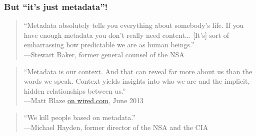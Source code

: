 \begin{frame}
  \frametitle{But ``it's just metadata''!}
  \begin{quotation}
    ``Metadata absolutely tells you everything about somebody’s life. 
    If you have enough metadata you don’t really need content$\dots$ 
    [It’s] sort of embarrassing how predictable we are as human beings.'' \\
    \hfill---Stewart Baker, former general counsel of the NSA\\[1cm]
  \end{quotation}

  {
    \begin{quotation}
      ``Metadata is our context. And that can reveal far more about us than the
      words we speak. Context yields insights into who we are and the implicit,
      hidden relationships between us.'' \\
      \hfill---Matt Blaze
      \href{http://www.wired.com/2013/06/phew-it-was-just-metadata-not-think-again/}{on
        wired.com}, June 2013
    \end{quotation}
  }

  {
    \begin{quotation}
    ``We kill people based on metadata.''\\
    \hfill---Michael Hayden, former director of the NSA and the CIA
    \end{quotation}
  }
\end{frame}


